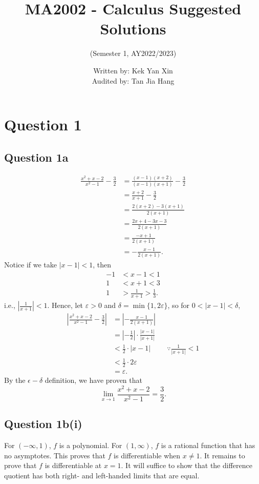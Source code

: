 \documentclass[12pt]{article}
\title{MA2002 - Calculus Suggested Solutions}
\author{(Semester 1, AY2022/2023)}
\date{Written by: Kek Yan Xin\\ Audited by: Tan Jia Hang}
\begin{document}
\maketitle
\section*{Question 1}
\subsection*{Question 1a}

\begin{align*}
    \frac{x^2+x-2}{x^2-1} - \frac{3}{2} &= \frac{(x-1)(x+2)}{(x-1)(x+1)} -\frac{3}{2}\\
    &= \frac{x+2}{x+1} - \frac{3}{2}\\
    &= \frac{2(x+2)-3(x+1)}{2(x+1)}\\
    &= \frac{2x+4-3x-3}{2(x+1)}\\
    &= \frac{-x+1}{2(x+1)}\\
    &= -\frac{x-1}{2(x+1)}.
\end{align*}
Notice if we take $|x-1|<1$, then
\begin{align*}
    -1 &< x-1 < 1\\
    1 &< x+1 < 3\\
    1 &>\frac{1}{x+1}>\frac{1}{3}.
\end{align*}
i.e., $\left|\frac{1}{x+1}\right|<1$. Hence, let $\varepsilon>0$ and $\delta=\min\{1, 2\varepsilon\}$, so for $0<|x-1|<\delta$,
\begin{align*}
    \left|\frac{x^2+x-2}{x^2-1}-\frac{3}{2}\right|&= \left|-\frac{x-1}{2(x+1)}\right|\\
    &= \left|-\frac{1}{2}\right|\cdot\frac{|x-1|}{|x+1|}\\
    &< \frac{1}{2}\cdot|x-1| && \because \frac{1}{|x+1|}<1\\
    &<\frac{1}{2}\cdot 2\varepsilon\\
    &=\varepsilon.
\end{align*}
By the $\epsilon-\delta$ definition, we have proven that \[\lim_{x\rightarrow1} \frac{x^2+x-2}{x^2-1}=\frac{3}{2}.\]

\newpage
\subsection*{Question 1b(i)}
For $(-\infty, 1)$, $f$ is a polynomial. For $(1, \infty)$, $f$ is a rational function that has no asymptotes. This proves that $f$ is differentiable when $x\neq 1$. It remains to prove that $f$ is differentiable at $x=1$. It will suffice to show that the difference quotient has both right- and left-handed limits that are equal. 
\end{document}
